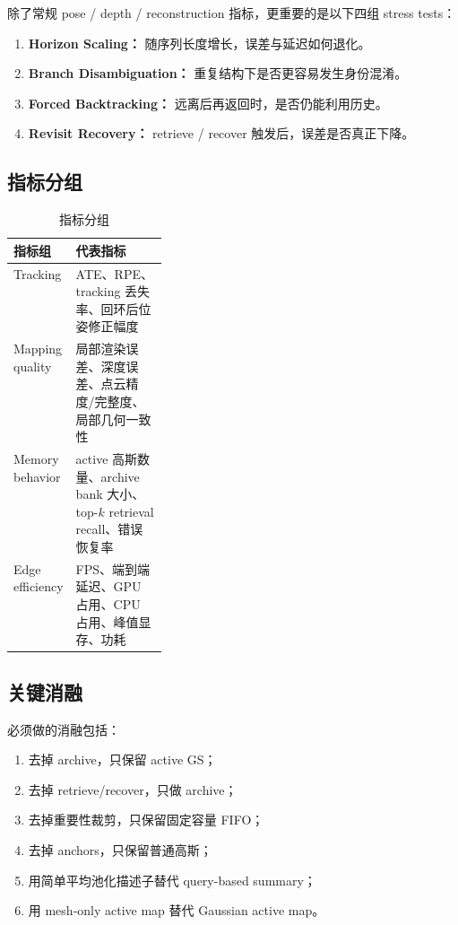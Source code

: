 \documentclass[12pt]{article}
\begin{document}
除了常规 pose / depth / reconstruction 指标，更重要的是以下四组 stress tests：
\begin{enumerate}
  \item \textbf{Horizon Scaling：} 随序列长度增长，误差与延迟如何退化。
  \item \textbf{Branch Disambiguation：} 重复结构下是否更容易发生身份混淆。
  \item \textbf{Forced Backtracking：} 远离后再返回时，是否仍能利用历史。
  \item \textbf{Revisit Recovery：} retrieve / recover 触发后，误差是否真正下降。
\end{enumerate}

\subsection{指标分组}

\begin{table}[H]
\centering
\caption{指标分组}
\label{tab:metrics}
\begin{tabularx}{\linewidth}{>{\raggedright\arraybackslash}p{0.2\linewidth} X}
\toprule
指标组 & 代表指标 \\
\midrule
Tracking & ATE、RPE、tracking 丢失率、回环后位姿修正幅度 \\
Mapping quality & 局部渲染误差、深度误差、点云精度/完整度、局部几何一致性 \\
Memory behavior & active 高斯数量、archive bank 大小、top-$k$ retrieval recall、错误恢复率 \\
Edge efficiency & FPS、端到端延迟、GPU 占用、CPU 占用、峰值显存、功耗 \\
\bottomrule
\end{tabularx}
\end{table}

\subsection{关键消融}

必须做的消融包括：
\begin{enumerate}
  \item 去掉 archive，只保留 active GS；
  \item 去掉 retrieve/recover，只做 archive；
  \item 去掉重要性裁剪，只保留固定容量 FIFO；
  \item 去掉 anchors，只保留普通高斯；
  \item 用简单平均池化描述子替代 query-based summary；
  \item 用 mesh-only active map 替代 Gaussian active map。
\end{enumerate}
\end{document}
